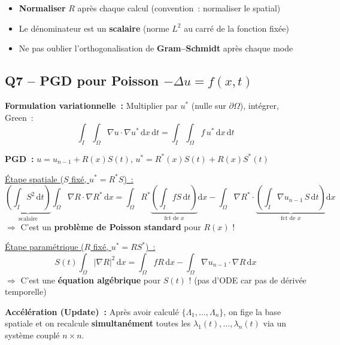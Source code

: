 \documentclass[11pt,a4paper]{article}
\begin{document}
\begin{warningbox}[Pi\`eges Q6]
\begin{itemize}[nosep]
\item \textbf{Normaliser} $R$ apr\`es chaque calcul (convention~: normaliser le spatial)
\item Le d\'enominateur est un \textbf{scalaire} (norme $L^2$ au carr\'e de la fonction fix\'ee)
\item Ne pas oublier l'orthogonalisation de \textbf{Gram--Schmidt} apr\`es chaque mode
\end{itemize}
\end{warningbox}

\subsection{Q7 -- PGD pour Poisson $-\Delta u = f(x,t)$}

\begin{formulabox}
\textbf{Formulation variationnelle~:} Multiplier par $u^*$ (nulle sur $\partial\Omega$), int\'egrer, Green~:
\[
\int_I\int_\Omega \nabla u \cdot \nabla u^*\,\mathrm{d}x\,\mathrm{d}t = \int_I\int_\Omega f\,u^*\,\mathrm{d}x\,\mathrm{d}t
\]

\textbf{PGD~:} $u = u_{n-1} + R(x)S(t)$, \quad $u^* = R^*(x)S(t) + R(x)S^*(t)$

\medskip
\underline{\'Etape spatiale ($S$ fix\'e, $u^* = R^*S$)~:}
\[
\underbrace{\left(\int_I S^2\,\mathrm{d}t\right)}_{\text{scalaire}} \int_\Omega\nabla R\cdot\nabla R^*\,\mathrm{d}x = \int_\Omega R^*\underbrace{\left(\int_I fS\,\mathrm{d}t\right)}_{\text{fct de }x}\mathrm{d}x - \int_\Omega\nabla R^*\cdot\underbrace{\left(\int_I\nabla u_{n-1}\,S\,\mathrm{d}t\right)}_{\text{fct de }x}\mathrm{d}x
\]
$\Rightarrow$ C'est un \textbf{probl\`eme de Poisson standard} pour $R(x)$ !

\medskip
\underline{\'Etape param\'etrique ($R$ fix\'e, $u^* = RS^*$)~:}
\[
\boxed{S(t)\int_\Omega|\nabla R|^2\,\mathrm{d}x = \int_\Omega fR\,\mathrm{d}x - \int_\Omega\nabla u_{n-1}\cdot\nabla R\,\mathrm{d}x}
\]
$\Rightarrow$ C'est une \textbf{\'equation alg\'ebrique} pour $S(t)$ ! (pas d'ODE car pas de d\'eriv\'ee temporelle)

\medskip
\textbf{Acc\'el\'eration (Update)~:} Apr\`es avoir calcul\'e $\{\Lambda_1,\ldots,\Lambda_n\}$, on fige la base spatiale et on recalcule \textbf{simultan\'ement} toutes les $\lambda_1(t),\ldots,\lambda_n(t)$ via un syst\`eme coupl\'e $n\times n$.
\end{formulabox}
\end{document}
